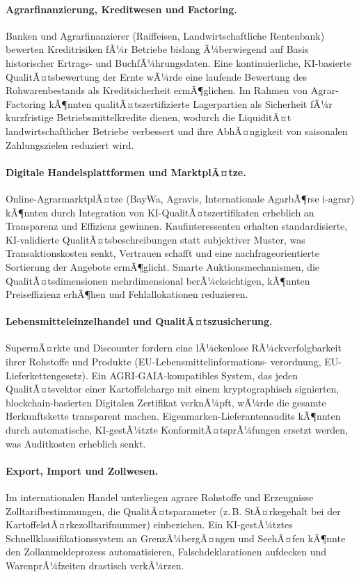 ﻿\documentclass[12pt,a4paper]{article}
\theoremstyle{plain}
\theoremstyle{definition}
\begin{document}
	\paragraph{Agrarfinanzierung, Kreditwesen und Factoring.}
	Banken und Agrarfinanzierer (Raiffeisen, Landwirtschaftliche Rentenbank)
	bewerten Kreditrisiken fÃ¼r Betriebe bislang Ã¼berwiegend auf Basis
	historischer Ertrags- und BuchfÃ¼hrungsdaten. Eine kontinuierliche,
	KI-basierte QualitÃ¤tsbewertung der Ernte wÃ¼rde eine laufende
	Bewertung des Rohwarenbestands als Kreditsicherheit ermÃ¶glichen.
	Im Rahmen von Agrar-Factoring kÃ¶nnten qualitÃ¤tszertifizierte
	Lagerpartien als Sicherheit fÃ¼r kurzfristige Betriebsmittelkredite
	dienen, wodurch die LiquiditÃ¤t landwirtschaftlicher Betriebe
	verbessert und ihre AbhÃ¤ngigkeit von saisonalen Zahlungszielen
	reduziert wird.

	\paragraph{Digitale Handelsplattformen und MarktplÃ¤tze.}
	Online-AgrarmarktplÃ¤tze (BayWa, Agravis, Internationale AgarbÃ¶rse
	i-agrar) kÃ¶nnten durch Integration von KI-QualitÃ¤tszertifi\-katen
	erheblich an Transparenz und Effizienz gewinnen. Kaufinteressenten
	erhalten standardisierte, KI-validierte QualitÃ¤tsbeschreibungen
	statt subjektiver Muster, was Transaktionskosten senkt,
	Vertrauen schafft und eine nachfrageorientierte Sortierung
	der Angebote ermÃ¶glicht. Smarte Auktionsmechanismen, die
	QualitÃ¤tsdimensionen mehrdimensional berÃ¼cksichtigen, kÃ¶nnten
	Preiseffizienz erhÃ¶hen und Fehlallokationen reduzieren.

	\paragraph{Lebensmitteleinzelhandel und QualitÃ¤tszusicherung.}
	SupermÃ¤rkte und Discounter fordern eine lÃ¼ckenlose
	RÃ¼ckverfolgbarkeit ihrer Rohstoffe und Produkte (EU-Lebensmittel\-informations-
	verordnung, EU-Lieferkettengesetz). Ein AGRI-GAIA-kompatibles System,
	das jeden QualitÃ¤ts\-vektor einer Kartoffelcharge mit einem
	kryptographisch signierten, blockchain-basierten Digitalen Zertifikat
	verknÃ¼pft, wÃ¼rde die gesamte Herkunftskette transparent machen.
	Eigenmarken-Lieferantenaudits kÃ¶nnten durch automatische, KI-gestÃ¼tzte
	KonformitÃ¤tsprÃ¼fungen ersetzt werden, was Auditkosten erheblich senkt.

	\paragraph{Export, Import und Zollwesen.}
	Im internationalen Handel unterliegen agrare Rohstoffe und Erzeugnisse
	Zolltarifbestimmungen, die QualitÃ¤tsparameter (z.\,B. StÃ¤rkegehalt
	bei der KartoffelstÃ¤rkezolltarifnummer) einbeziehen. Ein KI-gestÃ¼tztes
	Schnellklassifikationssystem an GrenzÃ¼bergÃ¤ngen und SeehÃ¤fen kÃ¶nnte
	den Zollanmeldeprozess automatisieren, Falschdeklarationen aufdecken
	und WarenprÃ¼fzeiten drastisch verkÃ¼rzen.
\end{document}
